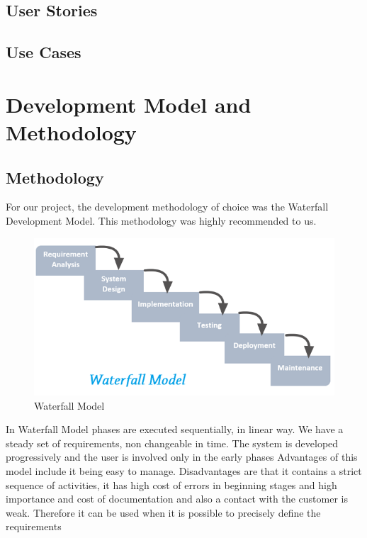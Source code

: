 \documentclass[a4paper,11pt,twoside]{report}
\theoremstyle{definition}
\begin{document}
\section{User Stories}

\section{Use Cases}




\chapter{Development Model and Methodology}


\section{Methodology}

For our project, the development methodology of choice was the Waterfall Development Model. This methodology was highly recommended to us.

\begin{figure}[h!]

\begin{center}

\includegraphics[width=\textwidth]{water}

\end{center}
\caption{Waterfall Model}
\end{figure}


In Waterfall Model phases are executed sequentially, in linear way. We have a steady set of requirements, non changeable in time. The system is developed progressively and the user is involved only in the early phases 
Advantages of this model include it being easy to manage. Disadvantages are that it contains a strict sequence of activities, it has high cost of errors in beginning stages and high importance and cost of documentation and also a contact with the customer is weak. Therefore it can be used when it is possible to precisely define the requirements 
\end{document}

